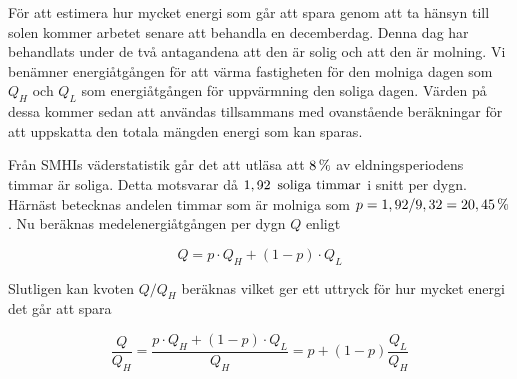 \noindent
För att estimera hur mycket energi som går att spara genom att ta hänsyn till solen kommer arbetet
senare att behandla en decemberdag. Denna dag har behandlats under de två antagandena att den är solig och att den är molning. Vi benämner energiåtgången för att värma fastigheten för den molniga dagen som $Q_H$ och
$Q_L$ som energiåtgången för uppvärmning den soliga dagen. Värden på dessa kommer sedan att användas tillsammans med
ovanstående beräkningar för att uppskatta den totala mängden energi som kan sparas. 

Från SMHIs väderstatistik går det att utläsa att $\unit[8]{\%}$ av eldningsperiodens timmar är soliga.\cite{SMHIdata}
Detta motsvarar då $\unit[1,92]{~soliga~timmar}$ i snitt per dygn. Härnäst betecknas andelen timmar som är molniga som
$p = 1,92/9,32 = \unit[20,45]{\%}$. Nu beräknas medelenergiåtgången per dygn $Q$ enligt

\begin{equation}
Q = p\cdot Q_H + (1-p)\cdot Q_L
\end{equation}

Slutligen kan kvoten $Q/Q_H$ beräknas vilket ger ett uttryck för hur mycket energi det går att spara

\begin{equation}
\frac{Q}{Q_H} = \frac{p\cdot Q_H + (1-p)\cdot Q_L}{Q_H} = p+(1-p)\frac{Q_L}{Q_H}
\end{equation}
